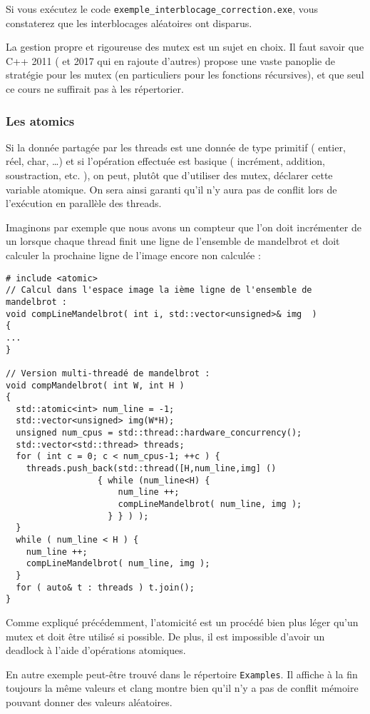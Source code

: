 \documentclass[fleqn,11pt]{article}
\begin{document}
Si vous exécutez le code \texttt{exemple\_interblocage\_correction.exe}, vous constaterez que les
interblocages aléatoires ont disparus. 

La gestion propre et rigoureuse des mutex est un sujet en choix. Il faut savoir que C++ 2011 ( et 2017
qui en rajoute d'autres) propose une vaste panoplie de stratégie pour les mutex (en particuliers pour les fonctions récursives), et que seul ce cours ne suffirait pas à les répertorier.

\subsubsection{Les atomics}

Si la donnée partagée par les threads est une donnée de type primitif ( entier, réel, char, \ldots ) et si l'opération effectuée est basique ( incrément, addition, soustraction, etc. ), on peut, plutôt que d'utiliser des mutex, déclarer cette variable atomique. On sera ainsi garanti qu'il n'y aura pas de conflit lors de l'exécution en parallèle des threads.

Imaginons par exemple que nous avons un compteur que l'on doit incrémenter de un lorsque chaque thread finit une ligne de l'ensemble de mandelbrot et doit calculer la prochaine ligne de l'image encore non calculée :

\begin{lstlisting}
# include <atomic>
// Calcul dans l'espace image la ième ligne de l'ensemble de mandelbrot :
void compLineMandelbrot( int i, std::vector<unsigned>& img  )
{
...
}

// Version multi-threadé de mandelbrot :
void compMandelbrot( int W, int H )
{
  std::atomic<int> num_line = -1;
  std::vector<unsigned> img(W*H);
  unsigned num_cpus = std::thread::hardware_concurrency();
  std::vector<std::thread> threads;
  for ( int c = 0; c < num_cpus-1; ++c ) {
    threads.push_back(std::thread([H,num_line,img] () 
				  { while (num_line<H) { 
				      num_line ++;
				      compLineMandelbrot( num_line, img );
				    } } ) );
  }
  while ( num_line < H ) {
    num_line ++;
    compLineMandelbrot( num_line, img );
  }
  for ( auto& t : threads ) t.join();
}
\end{lstlisting}

Comme expliqué précédemment, l'atomicité est un procédé bien plus léger qu'un mutex et doit être utilisé si possible. De plus, il est impossible d'avoir un deadlock à l'aide d'opérations atomiques.

En autre exemple peut-être trouvé dans le répertoire \texttt{Examples}. Il affiche à la fin toujours la même
valeurs et clang montre bien qu'il n'y a pas de conflit mémoire pouvant donner des valeurs aléatoires.
\end{document}

